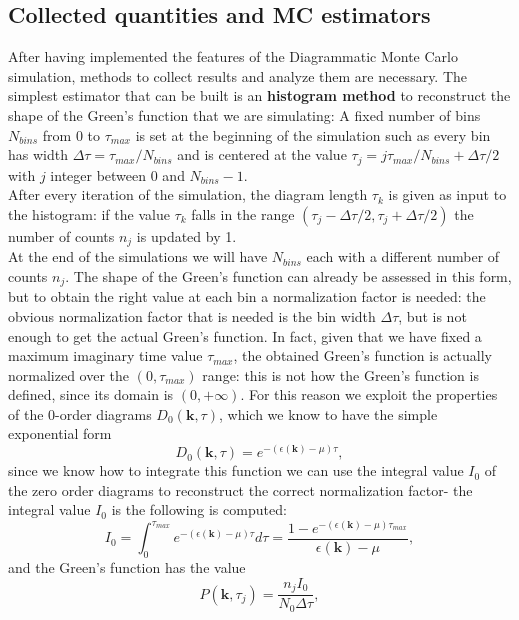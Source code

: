 \subsection{Collected quantities and MC estimators}
After having implemented the features of the Diagrammatic Monte Carlo simulation, methods to collect results and analyze them are necessary. 
The simplest estimator that can be built is an \textbf{histogram method} to reconstruct the shape of the Green's function that we are simulating: 
A fixed number of bins $N_{bins}$ from 0 to $\tau_{max}$ is set at the beginning of the simulation such as every bin has width $\Delta\tau=\tau_{max}/N_{bins}$ and is centered at the value
$\tau_{j}=j\tau_{max}/N_{bins}+\Delta\tau/2$ with $j$ integer between 0 and $N_{bins}-1$.\\
After every iteration of the simulation, the diagram length $\tau_k$ is given as input to the histogram: if the value $\tau_k$ falls in the range  
$(\tau_{j}-\Delta\tau/2,\tau_j+\Delta\tau/2)$ the number of counts $n_j$ is updated by 1.\\
At the end of the simulations we will have $N_{bins}$ each with a different number 
of counts $n_j$. The shape of the Green's function can already be assessed in this form, but to obtain the right value at each bin a normalization factor 
is needed: the obvious normalization factor that is needed is the bin width $\Delta\tau$, but is not enough to get the actual Green's function. In fact, 
given that we have fixed a maximum imaginary time value $\tau_{max}$, the obtained Green's function is actually normalized over the $(0,\tau_{max})$ range: 
this is not how the Green's function is defined, since its domain is $(0,+\infty)$. For this reason we exploit the properties of the 0-order diagrams $D_0(\mathbf{k},\tau)$, which we know to 
have the simple exponential form 
\begin{equation}
    D_0(\mathbf{k},\tau)=e^{-(\epsilon(\mathbf{k})-\mu)\tau},
\end{equation}
since we know how to integrate this function we can use the integral value $I_0$ of the zero order diagrams to reconstruct the correct normalization factor-
the integral value $I_0$ is the following
 is computed:
\begin{equation}
    I_0=\int_{0}^{\tau_{max}}e^{-(\epsilon(\mathbf{k})-\mu)\tau}d\tau=\frac{1-e^{-(\epsilon(\mathbf{k})-\mu)\tau_{max}}}{\epsilon(\mathbf{k})-\mu},
\end{equation}
and the Green's function has the value
\begin{equation}
    P(\mathbf{k},\tau_j)=\frac{n_jI_0}{N_0\Delta\tau},
\end{equation}
